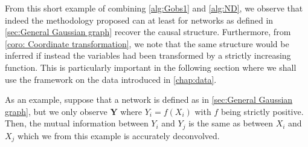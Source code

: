 \documentclass[../Thesis.tex]{subfiles}
\begin{document}
From this short example of combining \autoref{alg:Gobs1} and \autoref{alg:ND}, we observe that indeed the methodology proposed can at least for networks as defined in \autoref{sec:General Gaussian graph} recover the causal structure. Furthermore, from \autoref{coro: Coordinate transformation}, we note that the same structure would be inferred if instead the variables had been transformed by a strictly increasing function. This is particularly important in the following section where we shall use the framework on the data introduced in \autoref{chap:data}.

As an example, suppose that a network is defined as in \autoref{sec:General Gaussian graph}, but we only observe $\boldsymbol Y$ where $Y_i = f \left(X_i\right)$ with $f$ being strictly positive. Then, the mutual information between $Y_i$ and $Y_j$ is the same as between $X_i$ and $X_j$ which we from this example is accurately deconvolved.
\end{document}
